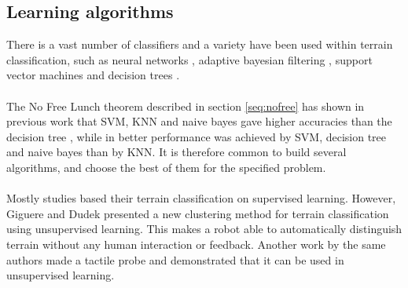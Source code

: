 \documentclass[USenglish]{ifimaster}  %
\begin{document}

\subsection{Learning algorithms}
There is a vast number of classifiers and a variety have been used within terrain classification, such as neural networks \cite{6784609,5752869,4654717}, adaptive bayesian filtering  \cite{5152327,6849778}, support vector machines \cite{5602459,4161556,4059113} and decision trees  \cite{6849778}.
\\
\\
The No Free Lunch theorem described in section \ref{seq:nofree} has shown in previous work that SVM, KNN and naive bayes gave higher accuracies than the decision tree \cite{DBLP:conf/emcr/WeissFSZ07}, while in \cite{6849778} better performance was achieved by SVM, decision tree and naive bayes than by KNN. It is therefore common to build several algorithms, and choose the best of them for the specified problem. 
\\
\\
Mostly studies based their terrain classification on supervised learning. However, Giguere and Dudek \cite{Giguere2009} presented a new clustering method for terrain classification using unsupervised learning. This makes a robot able to automatically distinguish terrain without any human interaction or feedback. Another work by the same authors  \cite{5752869} made a tactile probe and demonstrated that it can be used in unsupervised learning.
	
\end{document}
